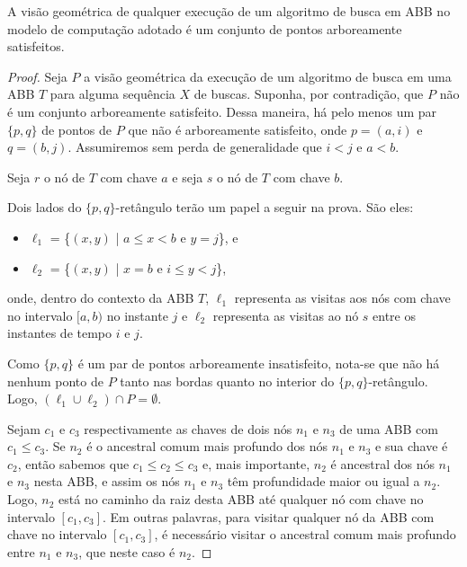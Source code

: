 \begin{lemma} A visão geométrica de qualquer execução de um algoritmo de busca em ABB no modelo de computação adotado é um conjunto de pontos arboreamente satisfeitos.
\label{lema:visao_geometrica_vira_ASS}
\end{lemma}

\begin{proof}
Seja $P$ a visão geométrica da execução de um algoritmo de busca em uma ABB $T$ para alguma sequência $X$ de buscas.
Suponha, por contradição, que $P$ não é um conjunto arboreamente satisfeito. Dessa maneira, há pelo menos um par $\{p,q\}$ de pontos de $P$ que não é arboreamente satisfeito, onde $p = (a,i)$ e $q = (b,j)$. Assumiremos sem perda de generalidade que $i < j$ e $a < b$.

Seja $r$ o nó de $T$ com chave $a$ e seja $s$ o nó de $T$ com chave $b$.

Dois lados do $\{p,q\}$-retângulo terão um papel a seguir na prova. São eles:
\begin{itemize}
    \item $\ell_1$ = \{$(x,y)$ | $a \leq x < b$ e $y = j$\}, e
    \item $\ell_2$ = \{$(x,y)$ | $x = b$ e $i \leq y < j$\},
\end{itemize}
onde, dentro do contexto da ABB $T$, $\ell_1$ representa as visitas aos nós com chave no intervalo $[a,b)$ no instante $j$ e $\ell_2$ representa as visitas ao nó $s$ entre os instantes de tempo $i$ e $j$.

Como $\{p,q\}$ é um par de pontos arboreamente insatisfeito, nota-se que não há nenhum ponto de $P$ tanto nas bordas quanto no interior do $\{p,q\}$-retângulo. Logo, $(\ell_1 \cup \ell_2) \cap P = \emptyset$.

Sejam $c_1$ e $c_3$ respectivamente as chaves de dois nós $n_1$ e $n_3$ de uma ABB com $c_1 \leq c_3$. Se $n_2$ é o ancestral comum mais profundo dos nós $n_1$ e $n_3$ e sua chave é $c_2$, então sabemos que $c_1 \leq c_2 \leq c_3$ e, mais importante, $n_2$ é ancestral dos nós $n_1$ e $n_3$ nesta ABB, e assim os nós $n_1$ e $n_3$ têm profundidade maior ou igual a $n_2$. Logo, $n_2$ está no caminho da raiz desta ABB até qualquer nó com chave no intervalo $[c_1,c_3]$. Em outras palavras, para visitar qualquer nó da ABB com chave no intervalo $[c_1,c_3]$, é necessário visitar o ancestral comum mais profundo entre $n_1$ e $n_3$, que neste caso é $n_2$.



\end{proof}
